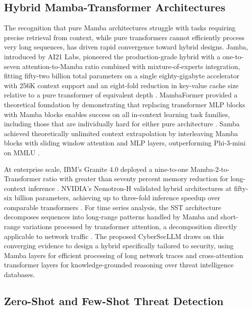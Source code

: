 \documentclass[journal]{IEEEtran}
\newcommand{\modelname}{CyberSecLLM}
\begin{document}
\subsection{Hybrid Mamba-Transformer Architectures}
\label{subsec:hybrid}

The recognition that pure Mamba architectures struggle with tasks requiring precise retrieval from context, while pure transformers cannot efficiently process very long sequences, has driven rapid convergence toward hybrid designs. Jamba, introduced by AI21 Labs, pioneered the production-grade hybrid with a one-to-seven attention-to-Mamba ratio combined with mixture-of-experts integration, fitting fifty-two billion total parameters on a single eighty-gigabyte accelerator with 256K context support and an eight-fold reduction in key-value cache size relative to a pure transformer of equivalent depth \cite{lieber2024jamba}. MambaFormer provided a theoretical foundation by demonstrating that replacing transformer MLP blocks with Mamba blocks enables success on all in-context learning task families, including those that are individually hard for either pure architecture \cite{park2024mambaformer}. Samba achieved theoretically unlimited context extrapolation by interleaving Mamba blocks with sliding window attention and MLP layers, outperforming Phi-3-mini on MMLU \cite{ren2024samba}.

At enterprise scale, IBM's Granite 4.0 deployed a nine-to-one Mamba-2-to-Transformer ratio with greater than seventy percent memory reduction for long-context inference \cite{ibm2025granite}. NVIDIA's Nemotron-H validated hybrid architectures at fifty-six billion parameters, achieving up to three-fold inference speedup over comparable transformers \cite{nvidia2025nemotron}. For time series analysis, the SST architecture decomposes sequences into long-range patterns handled by Mamba and short-range variations processed by transformer attention, a decomposition directly applicable to network traffic \cite{sst2024}. The proposed \modelname{} draws on this converging evidence to design a hybrid specifically tailored to security, using Mamba layers for efficient processing of long network traces and cross-attention transformer layers for knowledge-grounded reasoning over threat intelligence databases.

\subsection{Zero-Shot and Few-Shot Threat Detection}
\label{subsec:zeroshot}
\end{document}
